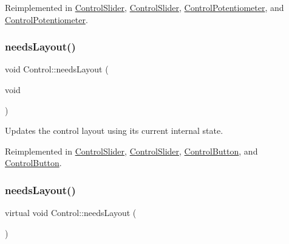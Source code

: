 Reimplemented in \hyperlink{classControlSlider_adb6f9deedd5830443e3560db6ab21020}{Control\+Slider}, \hyperlink{classControlSlider_aa2a17ce15e2136612b651ab5c2e4398e}{Control\+Slider}, \hyperlink{classControlPotentiometer_aa2bdcab40a678f249ee083c466064795}{Control\+Potentiometer}, and \hyperlink{classControlPotentiometer_a484e056833311821d4ea2f3ec4bde790}{Control\+Potentiometer}.

\mbox{\label{classControl_aa3c7bd1c9d2a072c037c6c9232a336a5}} 
\subsubsection{\texorpdfstring{needs\+Layout()}{needsLayout()}\hspace{0.1cm}{\footnotesize\ttfamily [1/2]}}
{\footnotesize\ttfamily void Control\+::needs\+Layout (\begin{DoxyParamCaption}\item[{void}]{ }\end{DoxyParamCaption})\hspace{0.3cm}{\ttfamily [virtual]}}

Updates the control layout using its current internal state. 

Reimplemented in \hyperlink{classControlSlider_a52ab7abbbcefc12704917d04dfea67c9}{Control\+Slider}, \hyperlink{classControlSlider_a2325b1df970fb4aff1ccb29aea4a20ea}{Control\+Slider}, \hyperlink{classControlButton_af0fc9343439e52c30c72a87183807487}{Control\+Button}, and \hyperlink{classControlButton_acdbe1882298d4920b6ba59e7c72d6aaf}{Control\+Button}.

\mbox{\label{classControl_ac4ef8db3d2c65c2cd9c9c7c79c402b0a}} 
\subsubsection{\texorpdfstring{needs\+Layout()}{needsLayout()}\hspace{0.1cm}{\footnotesize\ttfamily [2/2]}}
{\footnotesize\ttfamily virtual void Control\+::needs\+Layout (\begin{DoxyParamCaption}{ }\end{DoxyParamCaption})\hspace{0.3cm}{\ttfamily [virtual]}}

